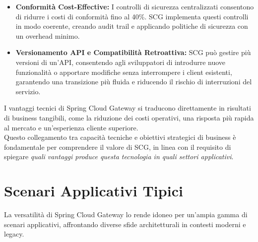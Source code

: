 \begin{itemize}
    \item \textbf{Conformità Cost-Effective:} I controlli di sicurezza centralizzati consentono di ridurre i costi di conformità fino al 40\%. SCG implementa questi controlli in modo coerente, creando audit trail e applicando politiche di sicurezza con un overhead minimo.
    \item \textbf{Versionamento API e Compatibilità Retroattiva:} SCG può gestire più versioni di un'API, consentendo agli sviluppatori di introdurre nuove funzionalità o apportare modifiche senza interrompere i client esistenti, garantendo una transizione più fluida e riducendo il rischio di interruzioni del servizio.
\end{itemize}

I vantaggi tecnici di Spring Cloud Gateway si traducono direttamente in risultati di business tangibili, come la riduzione dei costi operativi, una risposta più rapida al mercato e un'esperienza cliente superiore. \\
Questo collegamento tra capacità tecniche e obiettivi strategici di business è fondamentale per comprendere il valore di SCG, in linea con il requisito di spiegare \textit{quali vantaggi produce questa tecnologia in quali settori applicativi}.

\section{Scenari Applicativi Tipici}

La versatilità di Spring Cloud Gateway lo rende idoneo per un'ampia gamma di scenari applicativi, affrontando diverse sfide architetturali in contesti moderni e legacy.

